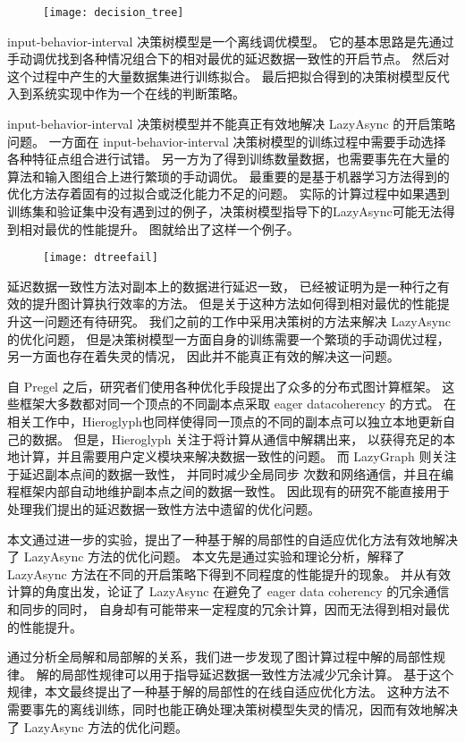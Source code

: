 \begin{figure}[!htbp]
\centering
\texttt{[image: decision\_tree]}
\label{fig:dtree}
\end{figure}


input-behavior-interval 决策树模型是一个离线调优模型。
它的基本思路是先通过手动调优找到各种情况组合下的相对最优的延迟数据一致性的开启节点。
然后对这个过程中产生的大量数据集进行训练拟合。
最后把拟合得到的决策树模型反代入到系统实现中作为一个在线的判断策略。


input-behavior-interval 决策树模型并不能真正有效地解决 LazyAsync 的开启策略问题。
一方面在 input-behavior-interval 决策树模型的训练过程中需要手动选择各种特征点组合进行试错。
另一方为了得到训练数量数据，也需要事先在大量的算法和输入图组合上进行繁琐的手动调优。
最重要的是基于机器学习方法得到的优化方法存着固有的过拟合或泛化能力不足的问题。
实际的计算过程中如果遇到训练集和验证集中没有遇到过的例子，决策树模型指导下的LazyAsync可能无法得到相对最优的性能提升。
图\label{fig:dtfail}就给出了这样一个例子。

\begin{figure}[!htbp]
\centering
\texttt{[image: dtreefail]}
\label{fig:dtfail}
\end{figure}

延迟数据一致性方法对副本上的数据进行延迟一致，
已经被证明为是一种行之有效的提升图计算执行效率的方法。
但是关于这种方法如何得到相对最优的性能提升这一问题还有待研究。
我们之前的工作中采用决策树的方法来解决 LazyAsync 的优化问题，
但是决策树模型一方面自身的训练需要一个繁琐的手动调优过程，另一方面也存在着失灵的情况，
因此并不能真正有效的解决这一问题。


自 Pregel 之后，研究者们使用各种优化手段提出了众多的分布式图计算框架。
这些框架大多数都对同一个顶点的不同副本点采取 eager datacoherency 的方式。
在相关工作中，Hieroglyph\cite{ju2017hieroglyph}也同样使得同一顶点的不同的副本点可以独立本地更新自己的数据。
但是，Hieroglyph 关注于将计算从通信中解耦出来， 以获得充足的本地计算，并且需要用户定义模块来解决数据一致性的问题。
而 LazyGraph 则关注于延迟副本点间的数据一致性， 并同时减少全局同步 次数和网络通信，并且在编程框架内部自动地维护副本点之间的数据一致性。 
因此现有的研究不能直接用于处理我们提出的延迟数据一致性方法中遗留的优化问题。


本文通过进一步的实验，提出了一种基于解的局部性的自适应优化方法有效地解决了 LazyAsync 方法的优化问题。
本文先是通过实验和理论分析，解释了LazyAsync 方法在不同的开启策略下得到不同程度的性能提升的现象。
并从有效计算的角度出发，论证了 LazyAsync 在避免了 eager data coherency 的冗余通信和同步的同时，
自身却有可能带来一定程度的冗余计算，因而无法得到相对最优的性能提升。

通过分析全局解和局部解的关系，我们进一步发现了图计算过程中解的局部性规律。
解的局部性规律可以用于指导延迟数据一致性方法减少冗余计算。
基于这个规律，本文最终提出了一种基于解的局部性的在线自适应优化方法。
这种方法不需要事先的离线训练，同时也能正确处理决策树模型失灵的情况，因而有效地解决了
LazyAsync 方法的优化问题。
